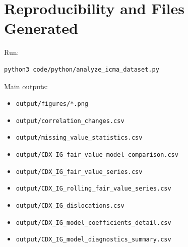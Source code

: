 \section{Reproducibility and Files Generated}
Run:
\begin{lstlisting}[style=pythonstyle]
python3 code/python/analyze_icma_dataset.py
\end{lstlisting}

Main outputs:
\begin{itemize}
  \item \texttt{output/figures/*.png}
  \item \texttt{output/correlation\_changes.csv}
  \item \texttt{output/missing\_value\_statistics.csv}
  \item \texttt{output/CDX\_IG\_fair\_value\_model\_comparison.csv}
  \item \texttt{output/CDX\_IG\_fair\_value\_series.csv}
  \item \texttt{output/CDX\_IG\_rolling\_fair\_value\_series.csv}
  \item \texttt{output/CDX\_IG\_dislocations.csv}
  \item \texttt{output/CDX\_IG\_model\_coefficients\_detail.csv}
  \item \texttt{output/CDX\_IG\_model\_diagnostics\_summary.csv}
\end{itemize}
